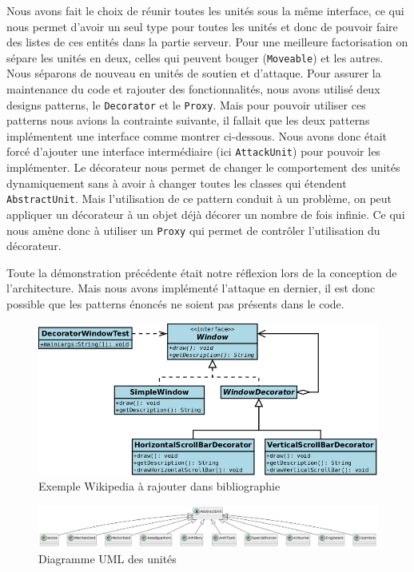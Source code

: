 Nous avons fait le choix de réunir toutes les unités sous la même interface, ce qui nous permet d'avoir un seul type pour toutes les unités et donc de pouvoir faire des listes de ces entités dans la partie serveur.
Pour une meilleure factorisation on sépare les unités en deux, celles qui peuvent bouger (\lstinline{Moveable}) et les autres. Nous séparons de nouveau en unités de soutien et d'attaque. Pour assurer la maintenance du code et rajouter des fonctionnalités, nous avons utilisé deux designs patterns, le \lstinline{Decorator} et le \lstinline{Proxy}. Mais pour pouvoir utiliser ces patterns nous avions la contrainte suivante, il fallait que les deux patterns implémentent une interface comme montrer ci-dessous. Nous avons donc était forcé d'ajouter une interface intermédiaire (ici \lstinline{AttackUnit}) pour pouvoir les implémenter. Le décorateur nous permet de changer le comportement des unités dynamiquement sans à avoir à changer toutes les classes qui étendent \lstinline{AbstractUnit}. Mais l'utilisation de ce pattern conduit à un problème, on peut appliquer un décorateur à un objet déjà décorer un nombre de fois infinie. Ce qui nous amène donc à utiliser un \lstinline{Proxy} qui permet de contrôler l'utilisation du décorateur. 

Toute la démonstration précédente était notre réflexion lors de la conception de l'architecture. Mais nous avons implémenté l'attaque en dernier, il est donc possible que les patterns énoncés ne soient pas présents dans le code.

\begin{figure}[H]
    \centering
    \includegraphics[scale=0.3]{data/UML_Decorator_Pattern_Exmple.png}
    \caption{Exemple Wikipedia à rajouter dans bibliographie}
\end{figure}

\begin{figure}[H]
    \centering
    \includegraphics[scale=0.3]{data/uml_abstract_unit.png}
    \caption{Diagramme UML des unités}
\end{figure}

